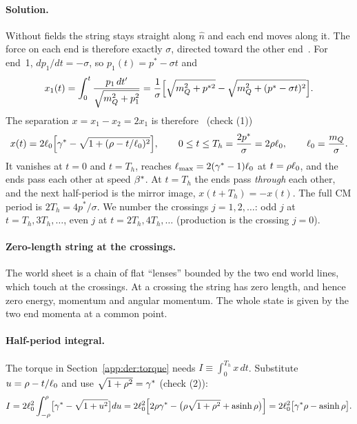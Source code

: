 \paragraph{Solution.} Without fields the string stays straight along $\hat n$ and each end moves along it. The force on
each end is therefore exactly $\sigma$, directed toward the other end~\cite[Sec.~3]{Kang:2008ea}. For end~1,
$dp_1/dt=-\sigma$, so $p_1(t)=p^*-\sigma t$ and
\begin{equation}
  x_1(t)=\int_0^t\frac{p_1\,dt'}{\sqrt{m_Q^2+p_1^2}}=\frac{1}{\sigma}\Bigl[\sqrt{m_Q^2+p^{*2}}-\sqrt{m_Q^2+(p^*-\sigma t)^2}\Bigr].
\end{equation}
The separation $x=x_1-x_2=2x_1$ is therefore~\cite{Kang:2008ea} (check  (1))
\begin{equation}
  x(t)=2\ell_0\Bigl[\gamma^*-\sqrt{1+(\rho-t/\ell_0)^2}\Bigr],\qquad 0\le t\le T_h=\frac{2p^*}{\sigma}=2\rho\ell_0,
  \qquad \ell_0=\frac{m_Q}{\sigma}.
  \label{eq:D:x}
\end{equation}
It vanishes at $t=0$ and $t=T_h$, reaches $\ell_{\max}=2(\gamma^*-1)\ell_0$ at $t=\rho\ell_0$, and the ends pass each other at
speed $\beta^*$. At $t=T_h$ the ends pass \emph{through} each other, and the next half-period is the mirror image,
$x(t+T_h)=-x(t)$. The full CM period is $2T_h=4p^*/\sigma$. We number the crossings $j=1,2,\ldots$: odd $j$ at
$t=T_h,3T_h,\ldots$, even $j$ at $t=2T_h,4T_h,\ldots$ (production is the crossing $j=0$).

\paragraph{Zero-length string at the crossings.} The world sheet is a chain of flat ``lenses'' bounded by the two end
world lines, which touch at the crossings. At a crossing the string has zero length, and hence zero energy, momentum and
angular momentum. The whole state is given by the two end momenta at a common point.

\paragraph{Half-period integral.} The torque in Section~\ref{app:der:torque} needs $I\equiv\int_0^{T_h}x\,dt$.
Substitute $u=\rho-t/\ell_0$ and use $\sqrt{1+\rho^2}=\gamma^*$ (check  (2)):
\begin{equation}
  I=2\ell_0^2\int_{-\rho}^{\rho}\bigl[\gamma^*-\sqrt{1+u^2}\bigr]du
   =2\ell_0^2\Bigl[2\rho\gamma^*-\bigl(\rho\sqrt{1+\rho^2}+\operatorname{asinh}\rho\bigr)\Bigr]
   =2\ell_0^2\bigl[\gamma^*\rho-\operatorname{asinh}\rho\bigr].
  \label{eq:D:I}
\end{equation}

